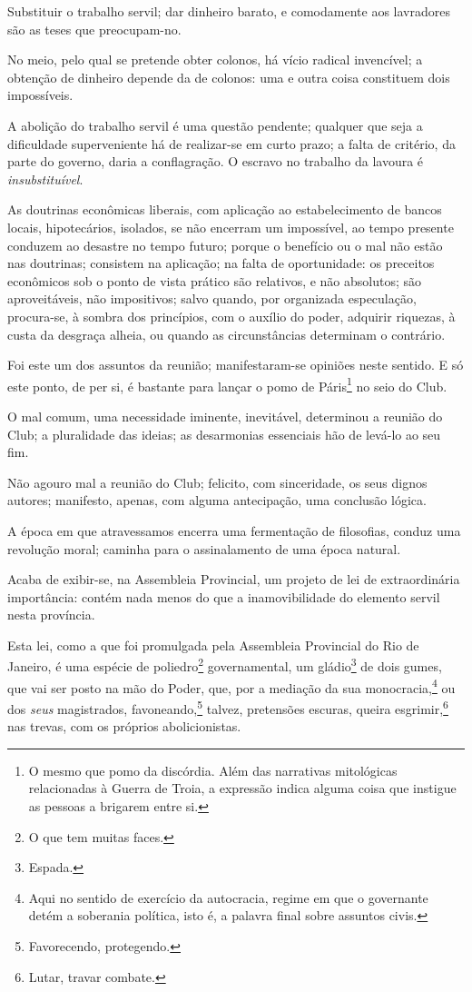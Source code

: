 Substituir o trabalho servil; dar dinheiro barato, e comodamente aos
lavradores são as teses que preocupam-no.

No meio, pelo qual se pretende obter colonos, há vício radical
invencível; a obtenção de dinheiro depende da de colonos: uma e outra
coisa constituem dois impossíveis.

A abolição do trabalho servil é uma questão pendente; qualquer que seja
a dificuldade superveniente há de realizar-se em curto prazo; a falta de
critério, da parte do governo, daria a conflagração. O escravo no
trabalho da lavoura é \emph{insubstituível}.

As doutrinas econômicas liberais, com aplicação ao estabelecimento de
bancos locais, hipotecários, isolados, se não encerram um impossível, ao
tempo presente conduzem ao desastre no tempo futuro; porque o benefício
ou o mal não estão nas doutrinas; consistem na aplicação; na falta de
oportunidade: os preceitos econômicos sob o ponto de vista prático são
relativos, e não absolutos; são aproveitáveis, não impositivos; salvo
quando, por organizada especulação, procura-se, à sombra dos princípios,
com o auxílio do poder, adquirir riquezas, à custa da desgraça alheia,
ou quando as circunstâncias determinam o contrário.

Foi este um dos assuntos da reunião; manifestaram-se opiniões neste
sentido. E só este ponto, de per si, é bastante para lançar o pomo de
Páris\footnote{O mesmo que pomo da discórdia. Além das narrativas
  mitológicas relacionadas à Guerra de Troia, a expressão indica alguma
  coisa que instigue as pessoas a brigarem entre si.} no seio do Club.

O mal comum, uma necessidade iminente, inevitável, determinou a reunião
do Club; a pluralidade das ideias; as desarmonias essenciais hão de
levá-lo ao seu fim.

Não agouro mal a reunião do Club; felicito, com sinceridade, os seus
dignos autores; manifesto, apenas, com alguma antecipação, uma conclusão
lógica.

A época em que atravessamos encerra uma fermentação de filosofias,
conduz uma revolução moral; caminha para o assinalamento de uma época
natural.

\asterisc

Acaba de exibir-se, na Assembleia Provincial, um projeto de lei de
extraordinária importância: contém nada menos do que a inamovibilidade
do elemento servil nesta província.

Esta lei, como a que foi promulgada pela Assembleia Provincial do Rio de
Janeiro, é uma espécie de poliedro\footnote{O que tem muitas faces.}
governamental, um gládio\footnote{Espada.} de dois gumes, que vai ser
posto na mão do Poder, que, por a mediação da sua monocracia,\footnote{
  Aqui no sentido de exercício da autocracia, regime em que o governante
  detém a soberania política, isto é, a palavra final sobre assuntos
  civis.} ou dos \emph{seus} magistrados, favoneando,\footnote{
  Favorecendo, protegendo.} talvez, pretensões escuras, queira
esgrimir,\footnote{Lutar, travar combate.} nas trevas, com os próprios
abolicionistas.

